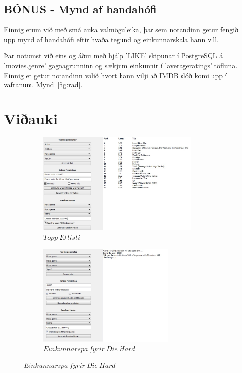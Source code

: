 \documentclass[11pt,a4paper]{amsart}
\theoremstyle{plain}
\theoremstyle{definition}
\theoremstyle{remark}
\begin{document}
\subsection{BÓNUS - Mynd af handahófi}
Einnig erum við með smá auka valmöguleika, þar sem notandinn getur fengið upp mynd af handahófi eftir hvaða tegund og einkunnarskala hann vill.\par Þar notumst við eins og áður með hjálp 'LIKE' skipunar í PostgreSQL á 'movies.genre' gagnagrunninn og sækjum einkunnir í 'averageratings' töfluna.  Einnig er getur notandinn valið hvort hann vilji að IMDB slóð komi upp í vafranum. Mynd~\ref{fig:rad}.

\newpage

\section{Viðauki}
\vspace{2mm}
\begin{figure}[H]
	\centering
	\begin{subfigure}[b]{0.5\textwidth}
		\includegraphics[height=50mm]{ui_top20.jpg}
		\caption{$ Topp\ 20\ listi $\label{fig:top20}}
	\end{subfigure}
	\begin{subfigure}[b]{0.4\textwidth}
		\includegraphics[height=50mm]{predict.jpg}
		\caption{$ Einkunnarspa\ fyrir\ Die\ Hard $\label{fig:predict}}	
	\end{subfigure}
\end{figure}
\vspace{2mm}
\end{document}
